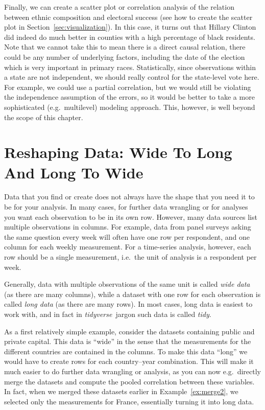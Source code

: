 Finally, we can create a scatter plot or correlation analysis of the relation between ethnic composition and electoral success (see how to create the scatter plot in Section~\ref{sec:visualization}).
In this case, it turns out that Hillary Clinton did indeed do much better in counties with a high percentage of black residents.
Note that we cannot take this to mean there is a direct causal relation, there could be any number of underlying factors, including the date of the election which is very important in primary races.
Statistically, since observations within a state are not independent, we should really control for the state-level vote here.
For example, we could use a partial correlation, but we would still be violating the independence assumption of the errors,
so it would be better to take a more sophisticated (e.g.\ multilevel) modeling approach.
This, however, is well beyond the scope of this chapter.


\section{Reshaping Data: Wide To Long And Long To Wide}\label{sec:pivot}

Data that you find or create does not always have the shape that you need it to be  for your analysis.
In many cases, for further data wrangling or for analyses you want each observation to be in its own row.
However, many data sources list multiple observations in columns.
For example, data from panel surveys asking the same question every week will often have one row per respondent,
and one column for each weekly measurement.
For a time-series analysis, however, each row should be a single measurement,
i.e.\ the unit of analysis is a respondent per week.

Generally, data with multiple observations of the same unit is called \emph{wide data} (as there are many columns),
while a dataset with one row for each observation is called \emph{long data} (as there are many rows).
In most cases, long data is easiest to work with, and in fact in \emph{tidyverse}\ jargon such data is called \emph{tidy}.

As a first relatively simple example, consider the datasets containing public and private capital.
This data is ``wide'' in the sense that the measurements for the different countries are contained in the columns.
To make this data ``long'' we would have to create rows for each country--year combination.
This will make it much easier to do further data wrangling or analysis, as you can now e.g.\ directly merge the datasets and compute the pooled correlation between these variables.
In fact, when we merged these datasets earlier in Example~\ref{ex:merge2}, we selected only the measurements for France, essentially turning it into long data.

